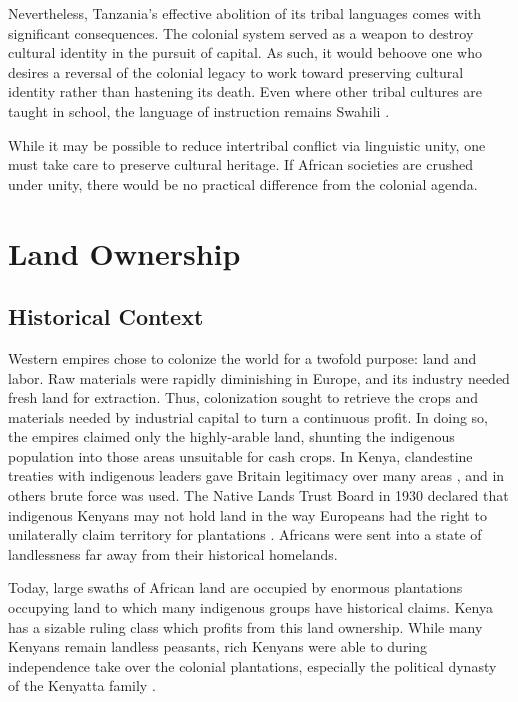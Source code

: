 \documentclass[american]{../../../coursework}
\begin{document}
Nevertheless, Tanzania's effective abolition of its tribal languages comes
with significant consequences. The colonial system served as a weapon to
destroy cultural identity in the pursuit of capital. As such, it would behoove
one who desires a reversal of the colonial legacy to work toward preserving
cultural identity rather than hastening its death. Even where other tribal
cultures are taught in school, the language of instruction remains Swahili
\parencite{Topan2008}.

While it may be possible to reduce intertribal conflict via linguistic unity,
one must take care to preserve cultural heritage. If African societies are
crushed under unity, there would be no practical difference from the colonial
agenda.

\section{Land Ownership}
\subsection{Historical Context}

Western empires chose to colonize the world for a twofold purpose: land and
labor. Raw materials were rapidly diminishing in Europe, and its industry
needed fresh land for extraction. Thus, colonization sought to retrieve the
crops and materials needed by industrial capital to turn a continuous profit.
In doing so, the empires claimed only the highly-arable land, shunting the
indigenous population into those areas unsuitable for cash crops. In Kenya,
clandestine treaties with indigenous leaders gave Britain legitimacy over many
areas \parencite{Rutten1992}, and in others brute force was used. The Native
Lands Trust Board in 1930 declared that indigenous Kenyans may not hold land
in the way Europeans had the right to unilaterally claim territory for
plantations \parencite{Syagga2006}. Africans were sent into a state of
landlessness far away from their historical homelands.

Today, large swaths of African land are occupied by enormous plantations
occupying land to which many indigenous groups have historical claims. Kenya
has a sizable ruling class which profits from this land ownership. While many
Kenyans remain landless peasants, rich Kenyans were able to during
independence take over the colonial plantations, especially the political
dynasty of the Kenyatta family \parencite{Syagga2006}.
\end{document}
